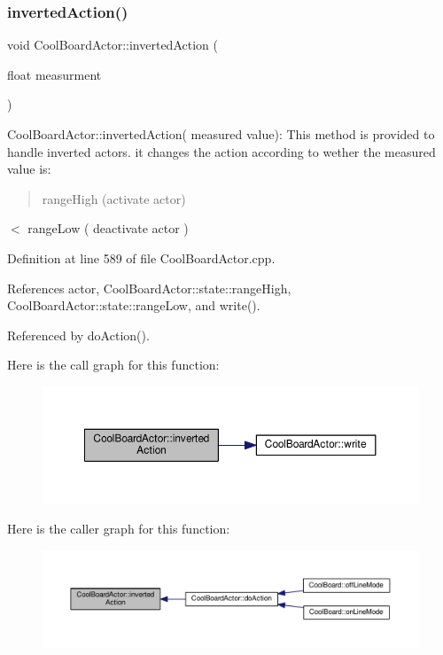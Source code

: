\subsubsection{\texorpdfstring{inverted\+Action()}{invertedAction()}}
{\footnotesize\ttfamily void Cool\+Board\+Actor\+::inverted\+Action (\begin{DoxyParamCaption}\item[{float}]{measurment }\end{DoxyParamCaption})}

Cool\+Board\+Actor\+::inverted\+Action( measured value)\+: This method is provided to handle inverted actors. it changes the action according to wether the measured value is\+: \begin{quote}
range\+High (activate actor) \end{quote}
$<$ range\+Low ( deactivate actor ) 

Definition at line 589 of file Cool\+Board\+Actor.\+cpp.



References actor, Cool\+Board\+Actor\+::state\+::range\+High, Cool\+Board\+Actor\+::state\+::range\+Low, and write().



Referenced by do\+Action().

Here is the call graph for this function\+:
\nopagebreak
\begin{figure}[H]
\begin{center}
\leavevmode
\includegraphics[width=350pt]{dc/d69/class_cool_board_actor_aae82b2e62f91be009d40f93c206f9bda_cgraph}
\end{center}
\end{figure}
Here is the caller graph for this function\+:
\nopagebreak
\begin{figure}[H]
\begin{center}
\leavevmode
\includegraphics[width=350pt]{dc/d69/class_cool_board_actor_aae82b2e62f91be009d40f93c206f9bda_icgraph}
\end{center}
\end{figure}
\mbox{\label{class_cool_board_actor_a02698bd647df49cabbe74513d4d88918}} 

